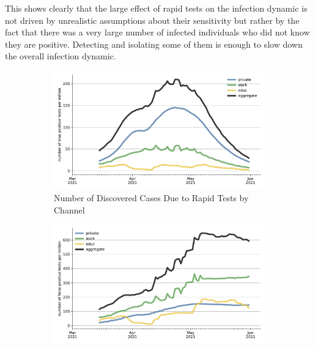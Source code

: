 This shows clearly that the large effect of rapid tests on the infection dynamic
is not driven by unrealistic assumptions about their sensitivity but rather by the
fact that there was a very large number of infected individuals who did not know they
are positive. Detecting and isolating some of them is enough to slow down the
overall infection dynamic.

\begin{figure}   %
    \centering
    \begin{subfigure}[b]{0.425\textwidth}
        \centering
        \includegraphics[width=\textwidth]{figures/results/figures/rapid_test_statistics/number_true_positive}
        \caption{Number of Discovered Cases Due to Rapid Tests by Channel}
        \label{fig:rapid_tests_number_true_positive}
    \end{subfigure}
    \hfill
    \begin{subfigure}[b]{0.425\textwidth}
        \centering
        \includegraphics[width=\textwidth]{figures/results/figures/rapid_test_statistics/number_false_positive}

\end{subfigure}
\end{figure}
